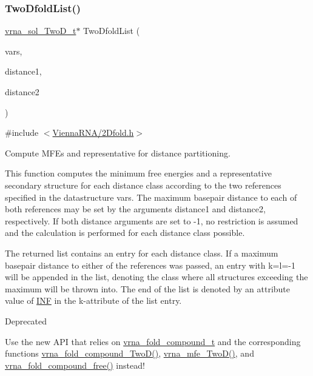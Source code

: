 \subsubsection{\texorpdfstring{Two\+Dfold\+List()}{TwoDfoldList()}}
{\footnotesize\ttfamily \mbox{\hyperlink{group__kl__neighborhood__mfe_structvrna__sol___two_d__t}{vrna\+\_\+sol\+\_\+\+Two\+D\+\_\+t}}$\ast$ Two\+Dfold\+List (\begin{DoxyParamCaption}\item[{\mbox{\hyperlink{group__kl__neighborhood__mfe_struct_two_dfold__vars}{Two\+Dfold\+\_\+vars}} $\ast$}]{vars,  }\item[{int}]{distance1,  }\item[{int}]{distance2 }\end{DoxyParamCaption})}



{\ttfamily \#include $<$\mbox{\hyperlink{2_dfold_8h}{Vienna\+R\+N\+A/2\+Dfold.\+h}}$>$}



Compute M\+FE\textquotesingle{}s and representative for distance partitioning. 

This function computes the minimum free energies and a representative secondary structure for each distance class according to the two references specified in the datastructure \textquotesingle{}vars\textquotesingle{}. The maximum basepair distance to each of both references may be set by the arguments \textquotesingle{}distance1\textquotesingle{} and \textquotesingle{}distance2\textquotesingle{}, respectively. If both distance arguments are set to \textquotesingle{}-\/1\textquotesingle{}, no restriction is assumed and the calculation is performed for each distance class possible.

The returned list contains an entry for each distance class. If a maximum basepair distance to either of the references was passed, an entry with k=l=-\/1 will be appended in the list, denoting the class where all structures exceeding the maximum will be thrown into. The end of the list is denoted by an attribute value of \mbox{\hyperlink{energy__const_8h_a12c2040f25d8e3a7b9e1c2024c618cb6}{I\+NF}} in the k-\/attribute of the list entry.

\begin{DoxyRefDesc}{Deprecated}
\item[\mbox{\hyperlink{deprecated__deprecated000004}{Deprecated}}]Use the new A\+PI that relies on \mbox{\hyperlink{group__fold__compound_ga1b0cef17fd40466cef5968eaeeff6166}{vrna\+\_\+fold\+\_\+compound\+\_\+t}} and the corresponding functions \mbox{\hyperlink{group__fold__compound_ga9d24b196753b4f9f03774f11661510f5}{vrna\+\_\+fold\+\_\+compound\+\_\+\+Two\+D()}}, \mbox{\hyperlink{group__kl__neighborhood__mfe_ga243c288b463147352829df04de6a2f77}{vrna\+\_\+mfe\+\_\+\+Two\+D()}}, and \mbox{\hyperlink{group__fold__compound_gadded6039d63f5d6509836e20321534ad}{vrna\+\_\+fold\+\_\+compound\+\_\+free()}} instead!\end{DoxyRefDesc}




